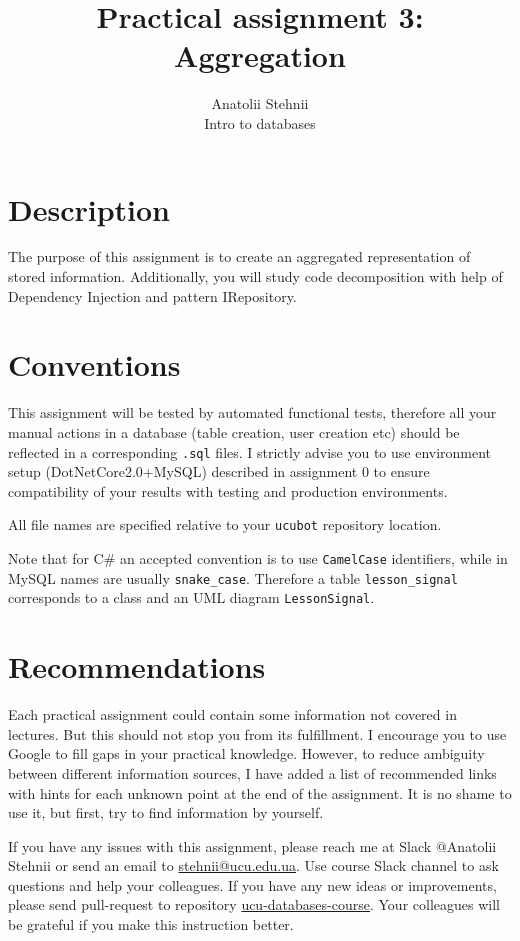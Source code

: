 \documentclass[12pt]{article}
\newcommand{\code}[1]{\texttt{#1}}
\begin{document}
\title{Practical assignment 3: Aggregation}
\author{Anatolii Stehnii\\Intro to databases}
\maketitle

\section*{Description}

The purpose of this assignment is to create an aggregated representation of stored information. Additionally, you will study code decomposition with help of Dependency Injection and pattern IRepository.

\section*{Conventions}

This assignment will be tested by automated functional tests, therefore all your manual actions in a database (table creation, user creation etc) should be reflected in a corresponding \code{.sql} files. I strictly advise you to use environment setup (DotNetCore2.0+MySQL) described in assignment 0 to ensure compatibility of your results with testing and production environments.

All file names are specified relative to your \code{ucubot} repository location.

Note that for C\# an accepted convention is to use \code{CamelCase} identifiers, while in MySQL names are usually \code{snake\_case}. Therefore a table \code{lesson\_signal} corresponds to a class and an UML diagram \code{LessonSignal}.

\section*{Recommendations}

Each practical assignment could contain some information not covered in lectures. But this should not stop you from its fulfillment. I encourage you to use Google to fill gaps in your practical knowledge. However, to reduce ambiguity between different information sources, I have added a list of recommended links with hints for each unknown point at the end of the assignment. It is no shame to use it, but first, try to find information by yourself.

If you have any issues with this assignment, please reach me at Slack @Anatolii Stehnii or send an email to \href{mailto:stehnii@ucu.edu.ua}{stehnii@ucu.edu.ua}. Use course Slack channel to ask questions and help your colleagues. If you have any new ideas or improvements, please send pull-request to repository \href{https://github.com/tsdaemon/ucu-databases-course}{ucu-databases-course}. Your colleagues will be grateful if you make this instruction better.
\end{document}
